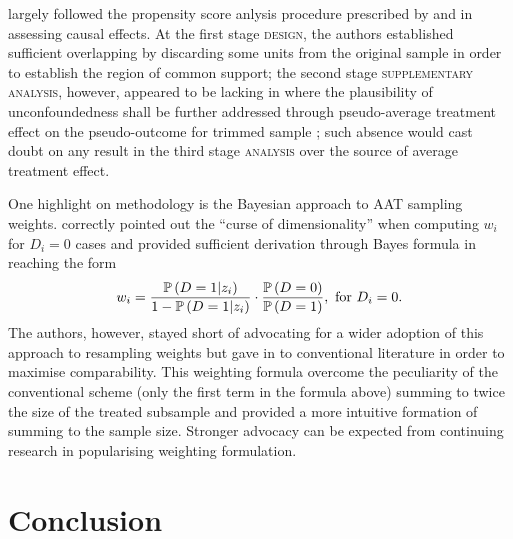 \textcite{sullivan:2013} largely followed the propensity score anlysis procedure prescribed by \textcite{imbens:2015b} and \textcite{imbens:2015a} in assessing causal effects. At the first stage \textsc{design}, the authors established sufficient overlapping by discarding some units from the original sample in order to establish the region of common support; the second stage \textsc{supplementary analysis}, however, appeared to be lacking in \textcite{sullivan:2013} where the plausibility of unconfoundedness shall be further addressed through pseudo-average treatment effect on the pseudo-outcome for trimmed sample \parencite[see][pp. 383--384]{imbens:2015a}; such absence would cast doubt on any result in the third stage \textsc{analysis} over the source of average treatment effect.

One highlight on methodology is the Bayesian approach to AAT sampling weights. \textcite{sullivan:2013} correctly pointed out the ``curse of dimensionality'' when computing
$w_i$ for $D_i = 0$ cases and provided sufficient derivation through Bayes formula in reaching the form
\[ w_i = \frac{\p{ D=1 | z_i}}{1-\p{ D=1 | z_i}} \cdot \frac{\p{D=0}}{\p{D=1}},\ \text{for}\ D_i=0. \]
The authors, however, stayed short of advocating for a wider adoption of this approach to resampling weights but gave in to conventional literature in order to maximise comparability. This weighting formula overcome the peculiarity of the conventional scheme (only the first term in the formula above) summing to twice the size of the treated subsample and provided a more intuitive formation of summing to the sample size. Stronger advocacy can be expected from continuing research in popularising  weighting formulation.

\section{Conclusion}

